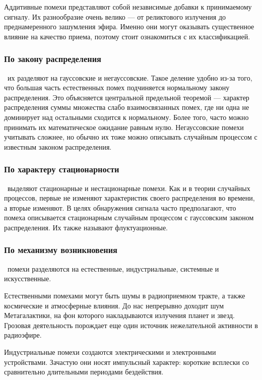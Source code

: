 Аддитивные помехи представляют собой независимые добавки к принимаемому сигналу. Их разнообразие очень велико --- от реликтового излучения до преднамеренного зашумления эфира. Именно они могут оказывать существенное влияние на качество приема, поэтому стоит ознакомиться с их классификацией.

\subsubsection{По закону распределения}\ их разделяют на гауссовские и негауссовские. Такое деление удобно из-за того, что большая часть естественных помех подчиняется нормальному закону распределения. Это объясняется центральной предельной теоремой --- характер распределения суммы множества слабо взаимосвязанных помех, где ни одна не доминирует над остальными сходится к нормальному. Более того, часто можно принимать их математическое ожидание равным нулю. Негауссовские помехи учитывать сложнее, но обычно их тоже можно описывать случайным процессом с известным законом распределения.

\subsubsection{По характеру стационарности}\ выделяют стационарные и нестационарные помехи. Как и в теории случайных процессов, первые не изменяют характеристик своего распределения во времени, а вторые изменяют. В целях обнаружения сигнала часто предполагают, что помеха описывается стационарным случайным процессом с гауссовским законом распределения. Их также называют флуктуационные.

\subsubsection{По механизму возникновения}\ помехи разделяются на естественные, индустриальные, системные и искусственные.

Естественными помехами могут быть шумы в радиоприемном тракте, а также космические и атмосферные влияния. До нас непрерывно доходит шум Метагалактики, на фон которого накладываются излучения планет и звезд. Грозовая деятельность порождает еще один источник нежелательной активности в радиоэфире.

Индустриальные помехи создаются электрическими и электронными устройствами. Зачастую они носят импульсный характер: короткие всплески со сравнительно длительными периодами бездействия.

